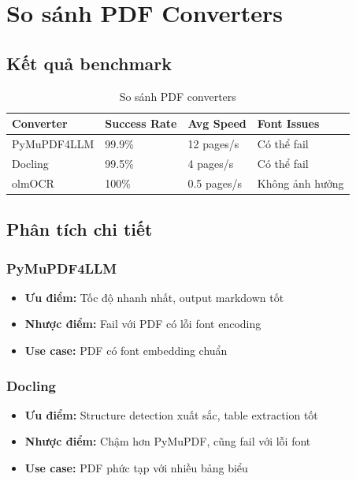 \documentclass[../DoAn.tex]{subfiles}
\begin{document}
\section{So sánh PDF Converters}

\subsection{Kết quả benchmark}
\begin{table}[h]
\centering
\begin{tabular}{|l|l|l|l|}
\hline
\textbf{Converter} & \textbf{Success Rate} & \textbf{Avg Speed} & \textbf{Font Issues} \\
\hline
PyMuPDF4LLM & 99.9\% & 12 pages/s & Có thể fail \\
\hline
Docling & 99.5\% & 4 pages/s & Có thể fail \\
\hline
olmOCR & 100\% & 0.5 pages/s & Không ảnh hưởng \\
\hline
\end{tabular}
\caption{So sánh PDF converters}
\end{table}

\subsection{Phân tích chi tiết}

\subsubsection{PyMuPDF4LLM}
\begin{itemize}
    \item \textbf{Ưu điểm:} Tốc độ nhanh nhất, output markdown tốt
    \item \textbf{Nhược điểm:} Fail với PDF có lỗi font encoding
    \item \textbf{Use case:} PDF có font embedding chuẩn
\end{itemize}

\subsubsection{Docling}
\begin{itemize}
    \item \textbf{Ưu điểm:} Structure detection xuất sắc, table extraction tốt
    \item \textbf{Nhược điểm:} Chậm hơn PyMuPDF, cũng fail với lỗi font
    \item \textbf{Use case:} PDF phức tạp với nhiều bảng biểu
\end{itemize}
\end{document}

